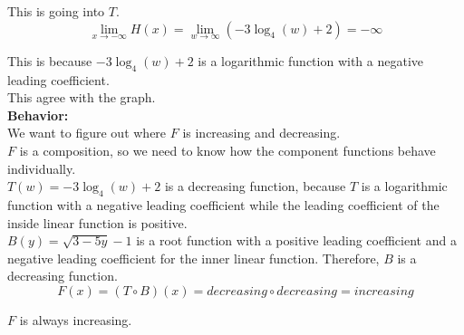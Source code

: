 \documentclass{ximera}
\begin{document}
This is going into $T$. \\



\[
\lim\limits_{x \to -\infty} H(x)  = \lim\limits_{w \to \infty} (-3 \log_4(w) + 2)  = -\infty
\]


This is because $-3 \log_4(w) + 2$ is a logarithmic function with a negative leading coefficient. \\




This agree with the graph.  \\
























\textbf{\textcolor{blue!55!black}{Behavior:}} \\


We want to figure out where $F$ is increasing and decreasing. \\

$F$ is a composition, so we need to know how the component functions behave individually. \\





$T(w) = -3 \log_4(w) + 2$ is a decreasing function, because $T$ is a logarithmic function with a negative leading coefficient while the leading coefficient of the inside linear function is  positive. \\

$B(y) = \sqrt{3 - 5y} - 1$ is a root function with a positive leading coefficient and a negative leading coefficient for the inner linear function.  Therefore, $B$ is a decreasing function.\\





\[
F(x) = (T \circ B)(x) = decreasing \circ decreasing = increasing
\]



$F$ is always increasing. \\
\end{document}
